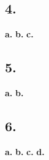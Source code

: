 \documentclass[11pt]{article}
\begin{document}
\subsection*{4.}
\textbf{a.}
\textbf{b.}
\textbf{c.}
\subsection*{5.}
\textbf{a.}
\textbf{b.}
\subsection*{6.}
\textbf{a.}
\textbf{b.}
\textbf{c.}
\textbf{d.}
\end{document}
